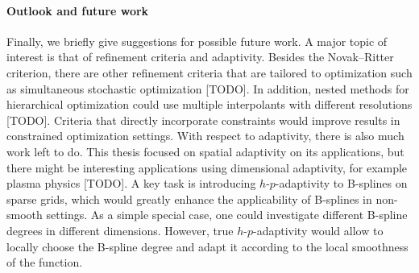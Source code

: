 \paragraph{Outlook and future work}

Finally, we briefly give suggestions for possible future work.
A major topic of interest is that of refinement criteria and adaptivity.
Besides the Novak--Ritter criterion,
there are other refinement criteria that are tailored to optimization
such as simultaneous stochastic optimization [TODO].
In addition, nested methods for hierarchical optimization could
use multiple interpolants with different resolutions [TODO].
Criteria that directly incorporate constraints would improve
results in constrained optimization settings.
With respect to adaptivity,
there is also much work left to do.
This thesis focused on spatial adaptivity on its applications,
but there might be interesting applications using dimensional adaptivity,
for example plasma physics [TODO].
A key task is introducing $h$-$p$-adaptivity to B-splines on sparse grids,
which would greatly enhance the applicability of B-splines in
non-smooth settings.
As a simple special case,
one could investigate different B-spline degrees in different dimensions.
However, true $h$-$p$-adaptivity would allow to locally choose the
B-spline degree and adapt it according to the local smoothness of the
function.

\pagebreak

